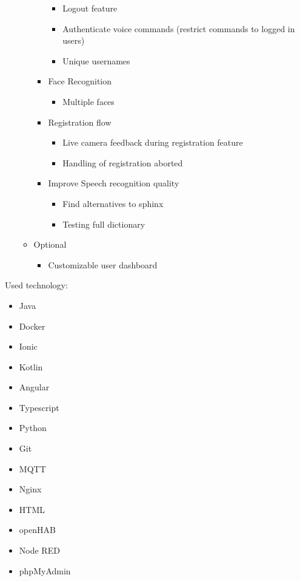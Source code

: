 \documentclass[12pt]{article}
\theoremstyle{definition}
\begin{document}
\begin{itemize}
\begin{itemize}
\begin{itemize}
            \begin{itemize}
                \item Logout feature
                \item Authenticate voice commands (restrict commands to logged in users)
                \item Unique usernames
            \end{itemize}
            \item Face Recognition
            \begin{itemize}
                \item Multiple faces
            \end{itemize}
            \item Registration flow
            \begin{itemize}
                \item Live camera feedback during registration feature
                \item Handling of registration aborted
            \end{itemize}
            \item Improve Speech recognition quality
            \begin{itemize}
                \item Find alternatives to sphinx
                \item Testing full dictionary
            \end{itemize}
        \end{itemize}
        \item Optional
        \begin{itemize}
            \item Customizable user dashboard
        \end{itemize}
    \end{itemize}
\end{itemize}
\pagebreak
Used technology:
\begin{itemize}
    \item Java
    \item Docker
    \item Ionic
    \item Kotlin
    \item Angular
    \item Typescript
    \item Python
    \item Git
    \item MQTT
    \item Nginx
    \item HTML
    \item openHAB
    \item Node RED
    \item phpMyAdmin
\end{itemize}
\end{document}
